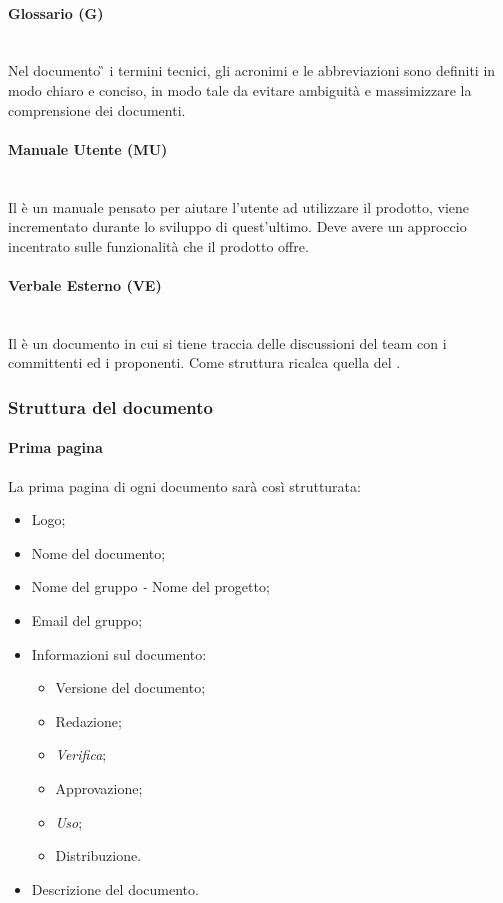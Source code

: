 	\paragraph{Glossario (G)}
	~\\Nel documento \G{} i termini tecnici, gli acronimi e le abbreviazioni sono definiti in modo chiaro e conciso, in modo tale da evitare ambiguità e massimizzare la comprensione dei documenti.
	\paragraph{Manuale Utente (MU)}
	~\\Il \MU{} è un manuale pensato per aiutare l'utente ad utilizzare il prodotto, viene incrementato durante lo sviluppo di quest'ultimo. Deve avere un approccio incentrato sulle funzionalità che il prodotto offre.
	\paragraph{Verbale Esterno (VE)}
	~\\Il \VE{} è un documento in cui si tiene traccia delle discussioni del team con i committenti ed i proponenti. Come struttura ricalca quella del \VI.
	
	\subsubsection{Struttura del documento}
	\paragraph{Prima pagina}
	La prima pagina di ogni documento sarà così strutturata:
	\begin{itemize}
		\item Logo;
		\item Nome del documento;
		\item Nome del gruppo \emph{-} Nome del progetto;
		\item Email del gruppo;
		\item Informazioni sul documento:
		\begin{itemize}
			\item Versione del documento;
			\item Redazione;
			\item \emph{Verifica};
			\item Approvazione;
			\item \emph{Uso};
			\item Distribuzione.
		\end{itemize}
		\item Descrizione del documento.
	\end{itemize}
